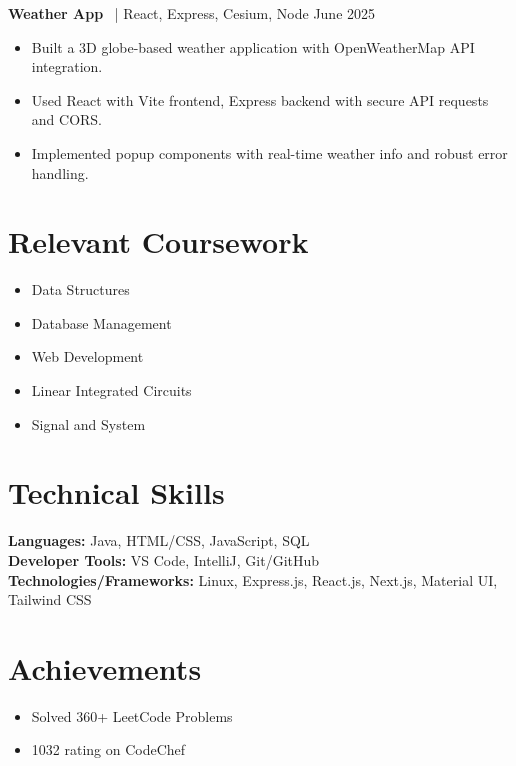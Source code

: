 \documentclass[a4paper,11pt]{article}
\begin{document}
\textbf{Weather App} \, | React, Express, Cesium, Node \hfill June 2025
\begin{itemize}[leftmargin=*]
  \item Built a 3D globe-based weather application with OpenWeatherMap API integration.
  \item Used React with Vite frontend, Express backend with secure API requests and CORS.
  \item Implemented popup components with real-time weather info and robust error handling.
\end{itemize}
\section{Relevant Coursework}
\begin{itemize}[leftmargin=*]
  \item Data Structures
  \item Database Management
  \item Web Development
  \item Linear Integrated Circuits
  \item Signal and System
\end{itemize}
\section{Technical Skills}
\textbf{Languages:} Java, HTML/CSS, JavaScript, SQL \\
\textbf{Developer Tools:} VS Code, IntelliJ, Git/GitHub \\
\textbf{Technologies/Frameworks:} Linux, Express.js, React.js, Next.js, Material UI, Tailwind CSS

\section{Achievements}
\begin{itemize}[leftmargin=*]
  \item Solved 360+ LeetCode Problems
  \item 1032 rating on CodeChef
\end{itemize}
\end{document}
